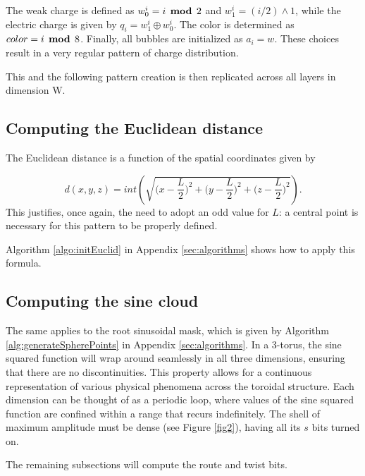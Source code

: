 \documentclass[12pt,english]{article}
\begin{document}
The weak charge is defined as $w_{0}^{i} = i \,\boldsymbol{\bmod}\, 2$ and $w_{1}^{i} = (i / 2) \land 1$, while the electric charge is given by $q_{i} = w_{1}^{i} \,\boldsymbol{\oplus}\, w_{0}^{i}$. The color is determined as $color = i \,\boldsymbol{\bmod}\, 8$. Finally, all bubbles are initialized as $a_{i} = w$. These choices result in a very regular pattern of charge distribution.

This and the following pattern creation is then replicated across all layers in dimension W.

\subsection{Computing the Euclidean distance}
The Euclidean distance is a function of the spatial coordinates given by

\[
d(x,y,z)=int\left(\sqrt{\bigg(x-\frac{L}{2}\bigg)^{2}+\bigg(y-\frac{L}{2}\bigg)^{2}+\bigg(z-\frac{L}{2}\bigg)^{2}}\right).
\]
This justifies, once again, the need to adopt an odd value for $L$: a central point is necessary for this pattern to be properly defined. 

Algorithm \ref{algo:initEuclid} in Appendix \ref{sec:algorithms} shows how to apply this formula.

\subsection{Computing the sine cloud} \label{subsec:sine-cloud}
The same applies to the root sinusoidal mask, which is given by Algorithm \ref{alg:generateSpherePoints} in Appendix \ref{sec:algorithms}. In a 3-torus, the sine squared function will wrap around seamlessly in all three dimensions, ensuring that there are no discontinuities. This property allows for a continuous representation of various physical phenomena across the toroidal structure. Each dimension can be thought of as a periodic loop, where values of the sine squared function are confined within a range that recurs indefinitely. The shell of maximum amplitude must be dense (see Figure \ref{fig2}), having all its $s$ bits turned on.

The remaining subsections will compute the route and twist bits.
\end{document}
